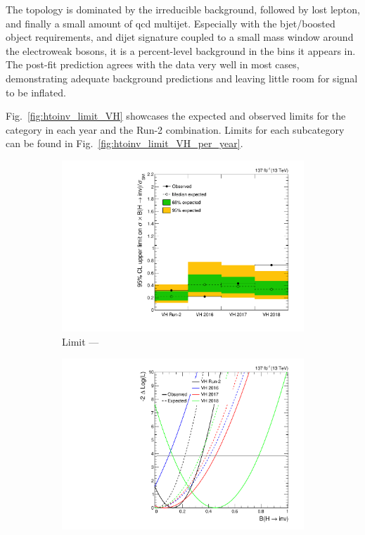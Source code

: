 The \VH topology is dominated by the irreducible \ztonunupjets background, followed by lost lepton, and finally a small amount of \acrshort{qcd} multijet. Especially with the \gls{bjet}/boosted object requirements, and dijet signature coupled to a small mass window around the electroweak bosons, it is a percent-level background in the bins it appears in. The post-fit prediction agrees with the data very well in most cases, demonstrating adequate background predictions and leaving little room for signal to be inflated.

Fig.~\ref{fig:htoinv_limit_VH} showcases the expected and observed limits for the \VH category in each year and the Run-2 combination. Limits for each subcategory can be found in Fig.~\ref{fig:htoinv_limit_VH_per_year}.

\begin{figure}[htbp]
    \centering
    \begin{subfigure}[t]{0.45\textwidth}
        \includegraphics[width=\textwidth]{figures/limits/VH/limit_Run2_VH.pdf}
        \caption{Limit --- \VH}
    \end{subfigure}
    \hspace{0.05\textwidth}
    \begin{subfigure}[t]{0.45\textwidth}
        \includegraphics[width=\textwidth]{figures/likelihood_scan/profile_likelihood_scan_Run2_VH.pdf}

\end{subfigure}
\end{figure}
